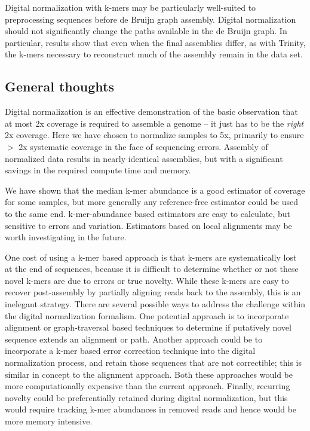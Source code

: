 \documentclass[10pt,draft]{article}
\begin{document}
Digital normalization with k-mers may be particularly well-suited to
preprocessing sequences before de Bruijn graph assembly.  Digital
normalization should not significantly change the paths available in
the de Bruijn graph.  In particular, results show that even when the
final assemblies differ, as with Trinity, the k-mers necessary to
reconstruct much of the assembly remain in the data set.

\subsection{General thoughts}

Digital normalization is an effective demonstration of the basic
observation that at most 2x coverage is required to assemble a genome
-- it just has to be the {\em right} 2x coverage.  Here we have chosen
to normalize samples to 5x, primarily to ensure $>$ 2x systematic
coverage in the face of sequencing errors.  Assembly of normalized
data results in nearly identical assemblies, but with a significant
savings in the required compute time and memory.

We have shown that the median k-mer abundance is a good estimator of
coverage for some samples, but more generally any reference-free
estimator could be used to the same end.  k-mer-abundance based
estimators are easy to calculate, but sensitive to errors and
variation.  Estimators based on local alignments may be worth
investigating in the future.

One cost of using a k-mer based approach is that k-mers are
systematically lost at the end of sequences, because it is difficult
to determine whether or not these novel k-mers are due to errors or
true novelty.  While these k-mers are easy to recover post-assembly by
partially aligning reads back to the assembly, this is an inelegant
strategy.  There are several possible ways to address the challenge
within the digital normalization formalism.  One potential approach is
to incorporate alignment or graph-traversal based techniques to
determine if putatively novel sequence extends an alignment or path.
Another approach could be to incorporate a k-mer based error
correction technique into the digital normalization process, and
retain those sequences that are not correctible; this is similar in
concept to the alignment approach.  Both these approaches would be
more computationally expensive than the current approach.  Finally,
recurring novelty could be preferentially retained during digital
normalization, but this would require tracking k-mer abundances in
removed reads and hence would be more memory intensive.
\end{document}
